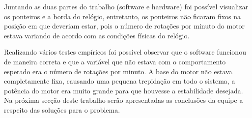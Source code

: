 Juntando as duas partes do trabalho (software e hardware) foi possível visualizar os ponteiros e a borda do relógio, entretanto, os ponteiros não ficaram fixos na posição em que deveriam estar, pois o número de rotações por minuto do motor estava variando de acordo com as condições físicas do relógio.

Realizando vários testes empíricos foi possível observar que o software funcionou de maneira correta e que a variável que não estava com o comportamento esperado era o número de rotações por minuto. A base do motor não estava completamente fixa, causando uma pequena trepidação em todo o sistema, a potência do motor era muito grande para que houvesse a estabilidade desejada. Na próxima secção deste trabalho serão apresentadas as conclusões da equipe a respeito das soluções para o problema.
